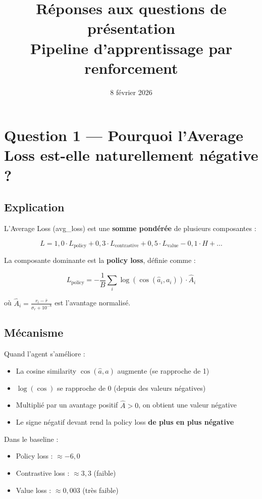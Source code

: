 \documentclass[11pt,a4paper]{article}
\title{Réponses aux questions de présentation\\Pipeline d'apprentissage par renforcement}
\author{}
\date{8 février 2026}
\begin{document}
\maketitle
\tableofcontents
\newpage

\section{Question 1 — Pourquoi l'Average Loss est-elle naturellement négative ?}

\subsection{Explication}

L'Average Loss (avg\_loss) est une \textbf{somme pondérée} de plusieurs composantes :

\begin{equation}
L = 1{,}0 \cdot L_{\text{policy}} + 0{,}3 \cdot L_{\text{contrastive}} + 0{,}5 \cdot L_{\text{value}} - 0{,}1 \cdot H + \ldots
\end{equation}

La composante dominante est la \textbf{policy loss}, définie comme :

\begin{equation}
L_{\text{policy}} = -\frac{1}{B}\sum_{i} \log(\cos(\hat{a}_i, a_i)) \cdot \hat{A}_i
\end{equation}

où $\hat{A}_i = \frac{r_i - \bar{r}}{\sigma_r + 10^{-8}}$ est l'avantage normalisé.

\subsection{Mécanisme}

Quand l'agent s'améliore :
\begin{itemize}
    \item La cosine similarity $\cos(\hat{a}, a)$ augmente (se rapproche de 1)
    \item $\log(\cos)$ se rapproche de 0 (depuis des valeurs négatives)
    \item Multiplié par un avantage positif $\hat{A} > 0$, on obtient une valeur négative
    \item Le signe négatif devant rend la policy loss \textbf{de plus en plus négative}
\end{itemize}

Dans le baseline :
\begin{itemize}
    \item Policy loss : $\approx -6{,}0$
    \item Contrastive loss : $\approx 3{,}3$ (faible)
    \item Value loss : $\approx 0{,}003$ (très faible)
\end{itemize}
\end{document}
